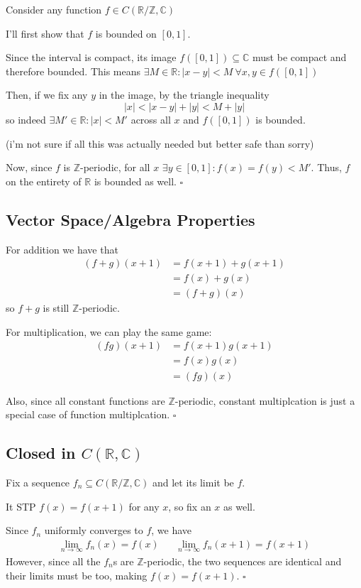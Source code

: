 \documentclass[12pt]{article}
\newcommand{\R}{\mathbb{R}}
\newcommand{\Z}{\mathbb{Z}}
\newcommand{\C}{\mathbb{C}}
\begin{document}
Consider any function $f \in C(\R/\Z, \C)$

I'll first show that $f$ is bounded on $[0, 1]$.

Since the interval is compact, its image $f([0, 1]) \subseteq \C$ must be compact and therefore bounded.
This means $\exists M \in \R: |x-y| < M\ \forall x, y \in f([0, 1])$

Then, if we fix any $y$ in the image, by the triangle inequality
\[|x| < |x-y| + |y| < M + |y|\]
so indeed $\exists M' \in \R: |x| < M'$ across all $x$ and $f([0, 1])$ is bounded.

(i'm not sure if all this was actually needed but better safe than sorry)

Now, since $f$ is $\Z$-periodic, for all $x$ $\exists y \in [0, 1]: f(x)=f(y) < M'$.
Thus, $f$ on the entirety of $\R$ is bounded as well. $\square$

\subsection{Vector Space/Algebra Properties}

For addition we have that
\begin{align*}
  (f+g)(x+1)
   & = f(x+1)+g(x+1) \\
   & = f(x)+g(x)     \\
   & = (f+g)(x)
\end{align*}
so $f+g$ is still $\Z$-periodic.

For multiplication, we can play the same game:
\begin{align*}
  (fg)(x+1)
   & = f(x+1)g(x+1) \\
   & = f(x)g(x)     \\
   & = (fg)(x)
\end{align*}

Also, since all constant functions are $\Z$-periodic,
constant multiplcation is just a special case of function multiplcation. $\square$

\pagebreak

\subsection{Closed in \texorpdfstring{$C(\R, \C)$}{C(R, C)}}

Fix a sequence $f_n \subseteq C(\R/\Z, \C)$ and let its limit be $f$.

It STP $f(x)=f(x+1)$ for any $x$, so fix an $x$ as well.

Since $f_n$ uniformly converges to $f$, we have
\begin{align*}
  \lim_{n \to \infty} f_n(x)=f(x) && \lim_{n \to \infty} f_n(x+1)=f(x+1)
\end{align*}
However, since all the $f_n$s are $\Z$-periodic,
the two sequences are identical and their limits must be too, making $f(x)=f(x+1)$. $\square$
\end{document}
